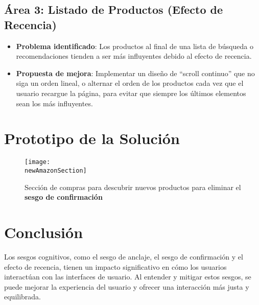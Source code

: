 	\subsection{Área 3: Listado de Productos (Efecto de Recencia)}

	\begin{itemize}
		\item \textbf{Problema identificado}: Los productos al final de una lista de
			búsqueda o recomendaciones tienden a ser más influyentes debido al efecto de
			recencia.

		\item \textbf{Propuesta de mejora}: Implementar un diseño de ``scroll continuo''
			que no siga un orden lineal, o alternar el orden de los productos cada vez
			que el usuario recargue la página, para evitar que siempre los últimos elementos
			sean los más influyentes.
	\end{itemize}


	\section{Prototipo de la Solución}

	\begin{figure}[h]
		\centering
		\texttt{[image: \\newAmazonSection]}
		\caption{Sección de compras para descubrir nuevos productos para eliminar el \textbf{sesgo de confirmación}}
	\end{figure}

	\section{Conclusión}

	Los sesgos cognitivos, como el sesgo de anclaje, el sesgo de confirmación y el
	efecto de recencia, tienen un impacto significativo en cómo los usuarios interactúan
	con las interfaces de usuario. Al entender y mitigar estos sesgos, se puede mejorar
	la experiencia del usuario y ofrecer una interacción más justa y equilibrada.


	\nocite{*} %

	\clearpage
	

	


